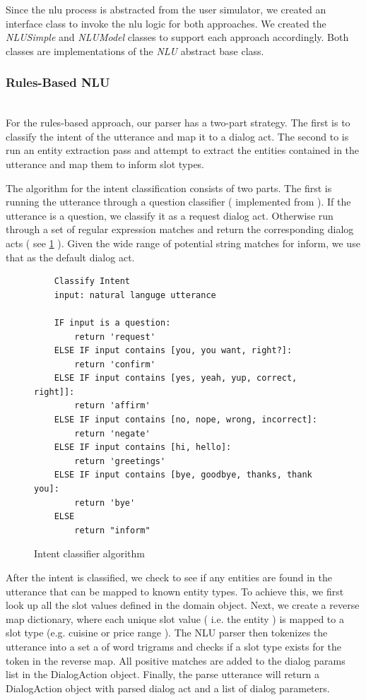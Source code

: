 Since the nlu process is abstracted from the user simulator, we created an interface class to invoke the nlu logic for both approaches. We created the \textit{NLUSimple} and \textit{NLUModel} classes to support each approach accordingly. Both classes are implementations of the\textit{ NLU} abstract base class. 

\subsubsection{Rules-Based NLU}
~ \\
For the rules-based approach, our parser has a two-part strategy. The first is to classify the intent of the utterance and map it to a dialog act. The second to is run an entity extraction pass and attempt to extract the entities contained in the utterance and map them to inform slot types.

The algorithm for the intent classification consists of two parts. The first is running the utterance through a question classifier ( implemented from \cite{chewning_lord_yarvis_2015} ). If the utterance is a question, we classify it as a request dialog act. Otherwise run through a set of regular expression matches and return the corresponding dialog acts ( see \ref{fig:intent_clf} ). Given the wide range of potential string matches for inform, we use that as the default dialog act. 

\begin{figure}[h!] 
	\label{fig:intent_clf}
	\begin{lstlisting}
	Classify Intent
	input: natural languge utterance
	
	IF input is a question:
		return 'request'
	ELSE IF input contains [you, you want, right?]:
		return 'confirm'
	ELSE IF input contains [yes, yeah, yup, correct, right]]:
		return 'affirm'
	ELSE IF input contains [no, nope, wrong, incorrect]:
		return 'negate'
	ELSE IF input contains [hi, hello]:
		return 'greetings'
	ELSE IF input contains [bye, goodbye, thanks, thank you]:
		return 'bye'
	ELSE
		return "inform"
	\end{lstlisting}
	\caption{ Intent classifier algorithm}
\end{figure}

After the intent is classified, we check to see if any entities are found in the utterance that can be mapped to known entity types. To achieve this, we first look up all the slot values defined in the domain object. Next, we create a reverse map dictionary, where each unique slot value ( i.e. the entity ) is mapped to a slot type (e.g. cuisine or price range ). The NLU parser then tokenizes the utterance into a set a of word trigrams and checks if a slot type exists for the token in the reverse map. All positive matches are added to the dialog params list in the DialogAction object. Finally, the parse utterance will return a DialogAction object with parsed dialog act and a list of dialog parameters. 

